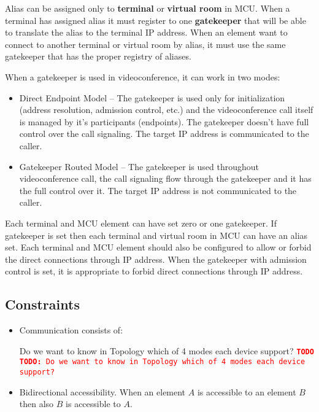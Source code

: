 \documentclass[a4paper]{report}
\newcommand{\TODO}[1]{%
\def\empty{}%
\def\prvniparametr{#1}%
\ifx\prvniparametr\empty%
\begingroup\tt\textcolor{red}{\noindent\textbf{TODO}}\endgroup
\else%
\begingroup\tt\textcolor{red}{\noindent\textbf{TODO:}\ #1}\endgroup
\fi%
}
\begin{document}
Alias can be assigned only to \textbf{terminal} or \textbf{virtual room} in MCU. When a terminal has assigned alias it must register to one \textbf{gatekeeper} that will be able to translate the alias to the terminal IP address. When an element want to connect to another terminal or virtual room by alias, it must use the same gatekeeper that has the proper registry of aliases.

When a gatekeeper is used in videoconference, it can work in two modes:
\begin{itemize}
\item Direct Endpoint Model -- The gatekeeper is used only for initialization (address resolution, admission control, etc.) and the videoconference call itself is managed by it's participants (endpoints). The gatekeeper doesn't have full control over the call signaling. The target IP address is communicated to the caller.
\item Gatekeeper Routed Model -- The gatekeeper is used throughout videoconference call, the call signaling flow through the gatekeeper and it has the full control over it. The target IP address is not communicated to the caller.
\end{itemize}

Each terminal and MCU element can have set zero or one gatekeeper. If gatekeeper is set then each terminal and virtual room in MCU can have an alias set. Each terminal and MCU element should also be configured to allow or forbid the direct connections through IP address. When the gatekeeper with admission control is set, it is appropriate to forbid direct connections through IP address.

\subsection{Constraints}

\begin{itemize}
\item Communication consists of:
\TODO{Do we want to know in Topology which of 4 modes each device support?}

\item Bidirectional accessibility. When an element $A$ is accessible to an element $B$ then also $B$ is accessible to $A$.
\end{itemize}
\end{document}
